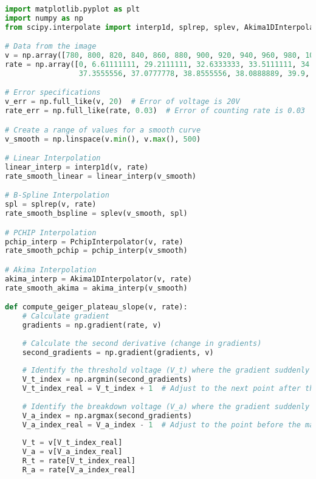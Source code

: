 \documentclass[a4paper,11pt]{article}
\begin{document}
\newpage
\noindent {}
\begin{lstlisting}[language=Python]
import matplotlib.pyplot as plt
import numpy as np
from scipy.interpolate import interp1d, splrep, splev, Akima1DInterpolator, PchipInterpolator

# Data from the image
v = np.array([780, 800, 820, 840, 860, 880, 900, 920, 940, 960, 980, 1000, 1020, 1040, 1060, 1080, 1100, 1120, 1140, 1160, 1180, 1200, 1220])
rate = np.array([0, 6.61111111, 29.2111111, 32.6333333, 33.5111111, 34.4777778, 34.7777778, 35.5666667, 36.0222222, 35.7888889, 36.4888889, 36.9111111, 
                 37.3555556, 37.0777778, 38.8555556, 38.0888889, 39.9, 40.2777778, 41.4111111, 41.1, 41.8666667, 44.4777778, 67.7444444])

# Error specifications
v_err = np.full_like(v, 20)  # Error of voltage is 20V
rate_err = np.full_like(rate, 0.03)  # Error of counting rate is 0.03

# Create a range of values for a smooth curve
v_smooth = np.linspace(v.min(), v.max(), 500)

# Linear Interpolation
linear_interp = interp1d(v, rate)
rate_smooth_linear = linear_interp(v_smooth)

# B-Spline Interpolation
spl = splrep(v, rate)
rate_smooth_bspline = splev(v_smooth, spl)

# PCHIP Interpolation
pchip_interp = PchipInterpolator(v, rate)
rate_smooth_pchip = pchip_interp(v_smooth)

# Akima Interpolation
akima_interp = Akima1DInterpolator(v, rate)
rate_smooth_akima = akima_interp(v_smooth)

def compute_geiger_plateau_slope(v, rate):
    # Calculate gradient
    gradients = np.gradient(rate, v)
    
    # Calculate the second derivative (change in gradients)
    second_gradients = np.gradient(gradients, v)
    
    # Identify the threshold voltage (V_t) where the gradient suddenly decreases to a small value
    V_t_index = np.argmin(second_gradients)
    V_t_index_real = V_t_index + 1  # Adjust to the next point after the minimum gradient
    
    # Identify the breakdown voltage (V_a) where the gradient suddenly increases to a large value
    V_a_index = np.argmax(second_gradients)
    V_a_index_real = V_a_index - 1  # Adjust to the point before the maximum gradient
    
    V_t = v[V_t_index_real]
    V_a = v[V_a_index_real]
    R_t = rate[V_t_index_real]
    R_a = rate[V_a_index_real]
    

\end{lstlisting}
\end{document}
